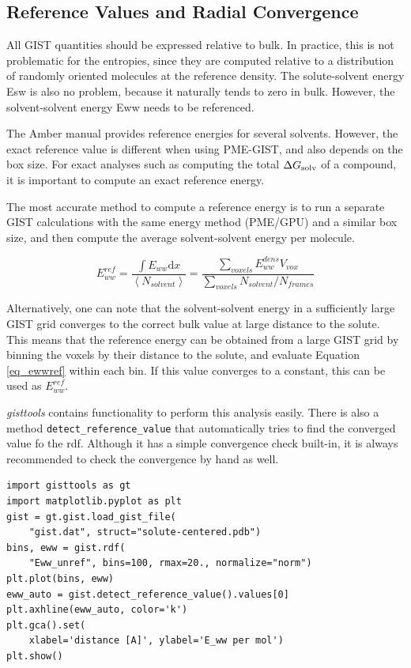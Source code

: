 \documentclass[9pt,tutorial]{livecoms}
\newcommand{\dgsolv}{\Delta G_\textup{solv}}
\newcommand{\software}{\emph}
\newcommand\inlinecode{\texttt}
\begin{document}
\subsection{Reference Values and Radial Convergence}
All GIST quantities should be expressed relative to bulk. In practice, this is not problematic for the entropies, since they are computed relative to a distribution of randomly oriented molecules at the reference density.
The solute-solvent energy Esw is also no problem, because it naturally tends to zero in bulk. 
However, the solvent-solvent energy Eww needs to be referenced.

The Amber manual provides reference energies for several solvents.
However, the exact reference value is different when using PME-GIST, and also depends on the box size.
For exact analyses such as computing the total $\dgsolv$ of a compound, it is important to compute an exact reference energy.

The most accurate method to compute a reference energy is to run a separate GIST calculations with the same energy method (PME/GPU) and a similar box size, and then compute the average solvent-solvent energy per molecule.

\begin{equation}
\label{eq_ewwref}
E_{ww}^\textit{ref} = \frac{\int{E_{ww}} \mathrm{d}x}{\left<N_\textit{solvent}\right>}
  = \frac{\sum_\textit{voxels}E_{ww}^\textit{dens} V_\textit{vox}}{\sum_\textit{voxels}{N_\textit{solvent}} / N_\textit{frames}}
\end{equation}

Alternatively, one can note that the solvent-solvent energy in a sufficiently large GIST grid converges to the correct bulk value at large distance to the solute.
This means that the reference energy can be obtained from a large GIST grid by binning the voxels by their distance to the solute, and evaluate Equation \ref{eq_ewwref} within each bin.
If this value converges to a constant, this can be used as $E_{ww}^\textit{ref}$.

\software{gisttools} contains functionality to perform this analysis easily.
There is also a method \inlinecode{detect\_reference\_value} that automatically tries to find the converged value fo the rdf.
Although it has a simple convergence check built-in, it is always recommended to check the convergence by hand as well.

\begin{lstlisting}[style=python]
import gisttools as gt
import matplotlib.pyplot as plt
gist = gt.gist.load_gist_file(
    "gist.dat", struct="solute-centered.pdb")
bins, eww = gist.rdf(
    "Eww_unref", bins=100, rmax=20., normalize="norm")
plt.plot(bins, eww)
eww_auto = gist.detect_reference_value().values[0]
plt.axhline(eww_auto, color='k')
plt.gca().set(
    xlabel='distance [A]', ylabel='E_ww per mol')
plt.show()
\end{lstlisting}
\end{document}
